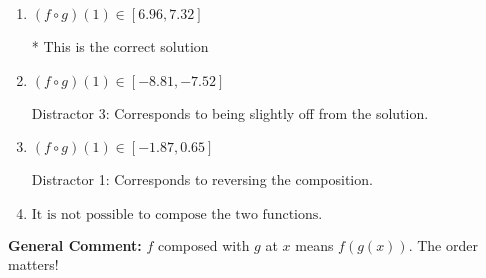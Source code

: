 \documentclass{extbook}[14pt]
\begin{document}
\begin{enumerate}
{\begin{enumerate}[label=\Alph*.]
 Distractor 2: Corresponds to being slightly off from the solution.
\item \( (f \circ g)(1) \in [6.96, 7.32] \)

* This is the correct solution
\item \( (f \circ g)(1) \in [-8.81, -7.52] \)

 Distractor 3: Corresponds to being slightly off from the solution.
\item \( (f \circ g)(1) \in [-1.87, 0.65] \)

 Distractor 1: Corresponds to reversing the composition.
\item \( \text{It is not possible to compose the two functions.} \)


\end{enumerate}

\textbf{General Comment:} $f$ composed with $g$ at $x$ means $f(g(x))$. The order matters!
}
\end{enumerate}
\end{document}
